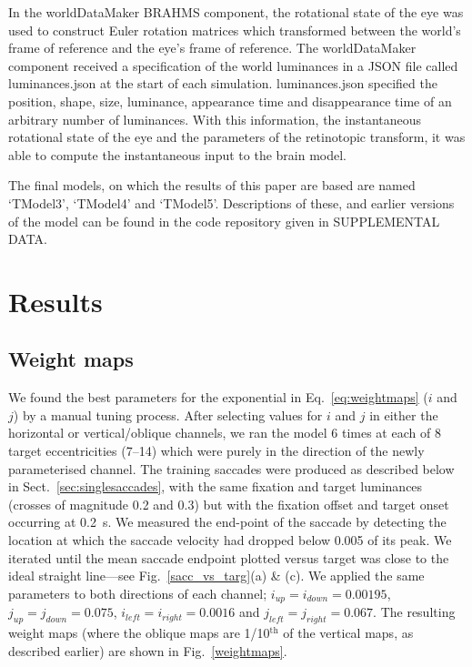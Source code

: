 \documentclass{frontiersSCNS}
\begin{document}
In the worldDataMaker BRAHMS component, the rotational state of the
eye was used to construct Euler rotation matrices which transformed
between the world's frame of reference and the eye's frame of
reference. The worldDataMaker component received a specification of
the world luminances in a JSON file called luminances.json at the
start of each simulation. luminances.json specified the position,
shape, size, luminance, appearance time and disappearance time of an
arbitrary number of luminances. With this information, the
instantaneous rotational state of the eye and the parameters of the
retinotopic transform, it was able to compute the instantaneous input
to the brain model.

The final models, on which the results of this paper are based are
named `TModel3', `TModel4' and `TModel5'. Descriptions of these, and earlier
versions of the model can be
found in the code repository given in SUPPLEMENTAL DATA.


\section{Results}

%

\subsection{Weight maps}

We found the best parameters for the exponential in Eq.~\ref{eq:weightmaps}
($i$ and $j$) by a manual tuning process. After selecting values for $i$ and $j$
in either the horizontal or vertical/oblique channels, we ran the model 6 times
at each of 8 target eccentricities (7\dg--14\dg) which were purely
in the direction of the
newly parameterised channel. The training saccades were produced as described below in
Sect.~\ref{sec:singlesaccades}, with the same fixation and target luminances
(crosses of magnitude 0.2 and 0.3) but with
the fixation offset and target onset occurring at 0.2~s. We measured the end-point
of the saccade by
detecting the location at which the saccade velocity had dropped below
0.005 of its peak. We iterated until the mean saccade endpoint plotted versus target
was close to the ideal straight line---see Fig.~\ref{sacc_vs_targ}(a) \& (c). We
applied the same parameters to both directions of each channel;
$i_{up} = i_{down} = 0.00195$, $j_{up} = j_{down} = 0.075$,
$i_{left} = i_{right} = 0.0016$ and $j_{left} = j_{right} = 0.067$. The resulting
weight maps (where the oblique maps are 1/10$^{\mathrm{th}}$ of the vertical maps,
as described earlier) are shown in Fig.~\ref{weightmaps}.
\end{document}
